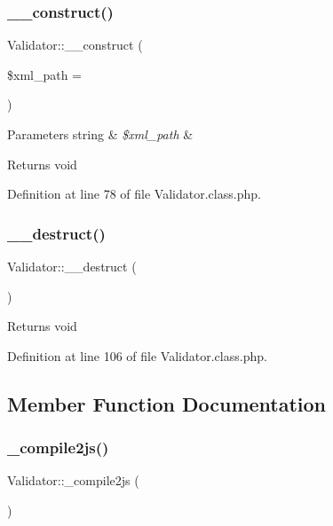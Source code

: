 \subsubsection{\texorpdfstring{\+\_\+\+\_\+construct()}{\_\_construct()}}
{\footnotesize\ttfamily Validator\+::\+\_\+\+\_\+construct (\begin{DoxyParamCaption}\item[{}]{\$xml\+\_\+path = {\ttfamily \textquotesingle{}\textquotesingle{}} }\end{DoxyParamCaption})}


\begin{DoxyParams}[1]{Parameters}
string & {\em \$xml\+\_\+path} & \\
\hline
\end{DoxyParams}
\begin{DoxyReturn}{Returns}
void 
\end{DoxyReturn}


Definition at line 78 of file Validator.\+class.\+php.

\hypertarget{classValidator_aa076d09e847e8461281d4912688a9388}{}\label{classValidator_aa076d09e847e8461281d4912688a9388} 
\subsubsection{\texorpdfstring{\+\_\+\+\_\+destruct()}{\_\_destruct()}}
{\footnotesize\ttfamily Validator\+::\+\_\+\+\_\+destruct (\begin{DoxyParamCaption}{ }\end{DoxyParamCaption})}

\begin{DoxyReturn}{Returns}
void 
\end{DoxyReturn}


Definition at line 106 of file Validator.\+class.\+php.



\subsection{Member Function Documentation}
\hypertarget{classValidator_ae7b44a7a2bfb3ee4672b4cf2cdbd059f}{}\label{classValidator_ae7b44a7a2bfb3ee4672b4cf2cdbd059f} 
\subsubsection{\texorpdfstring{\+\_\+compile2js()}{\_compile2js()}}
{\footnotesize\ttfamily Validator\+::\+\_\+compile2js (\begin{DoxyParamCaption}{ }\end{DoxyParamCaption})}

